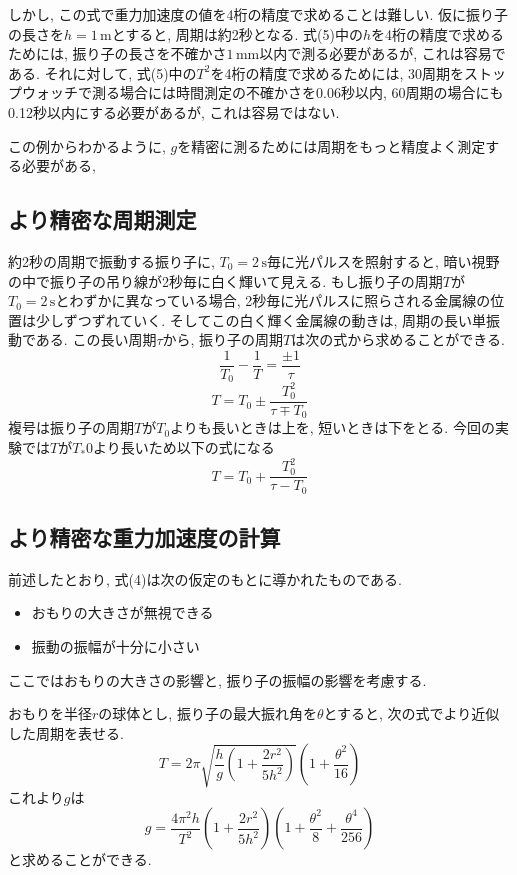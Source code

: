 \documentclass{jarticle}
\begin{document}
しかし, この式で重力加速度の値を4桁の精度で求めることは難しい.
仮に振り子の長さを$h=1\,\mathrm{m}$とすると, 周期は約2秒となる.
式(5)中の$h$を4桁の精度で求めるためには, 振り子の長さを不確かさ$1\,\mathrm{mm}$以内で測る必要があるが, これは容易である.
それに対して, 式(5)中の$T^2$を4桁の精度で求めるためには, 30周期をストップウォッチで測る場合には時間測定の不確かさを0.06秒以内, 60周期の場合にも0.12秒以内にする必要があるが, これは容易ではない.

この例からわかるように, $g$を精密に測るためには周期をもっと精度よく測定する必要がある,

\subsection{より精密な周期測定}

約2秒の周期で振動する振り子に, $T_0=2\,\mathrm{s}$毎に光パルスを照射すると, 暗い視野の中で振り子の吊り線が2秒毎に白く輝いて見える.
もし振り子の周期$T$が$T_0=2\,\mathrm{s}$とわずかに異なっている場合, 2秒毎に光パルスに照らされる金属線の位置は少しずつずれていく.
そしてこの白く輝く金属線の動きは, 周期の長い単振動である.
この長い周期$\tau$から, 振り子の周期$T$は次の式から求めることができる.
\begin{equation}
  \frac{1}{T_0}-\frac{1}{T}=\frac{\pm1}{\tau}
\end{equation}
\begin{equation}
  T=T_0\pm\frac{T_0^2}{\tau\mp T_0}
\end{equation}
複号は振り子の周期$T$が$T_0$よりも長いときは上を, 短いときは下をとる.
今回の実験では$T$が$T_*0$より長いため以下の式になる
\begin{equation}
  T=T_0+\frac{T_0^2}{\tau-T_0}
\end{equation}

\subsection{より精密な重力加速度の計算}

前述したとおり, 式(4)は次の仮定のもとに導かれたものである.
\begin{itemize}
  \item おもりの大きさが無視できる
  \item 振動の振幅が十分に小さい
\end{itemize}
ここではおもりの大きさの影響と, 振り子の振幅の影響を考慮する.

おもりを半径$r$の球体とし, 振り子の最大振れ角を$\theta$とすると, 次の式でより近似した周期を表せる.
\begin{equation}
  T=2\pi\sqrt{\frac{h}{g}\left(1+\frac{2r^2}{5h^2}\right)}\left(1+\frac{\theta^2}{16}\right)
\end{equation}
これより$g$は
\begin{equation}
  g=\frac{4\pi^2h}{T^2}\left(1+\frac{2r^2}{5h^2}\right)\left(1+\frac{\theta^2}{8}+\frac{\theta^4}{256}\right)
\end{equation}
と求めることができる.
\end{document}
